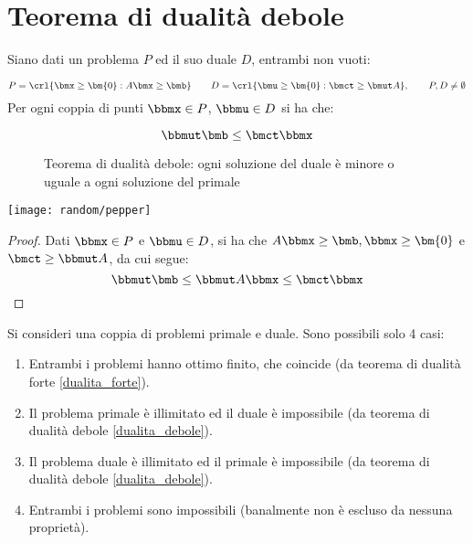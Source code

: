\documentclass[\main/main.tex]{subfiles}
\begin{document}
\section{Teorema di dualità debole}
\begin{minipage}{\textwidth}
  \begin{minipage}{.83\textwidth}
    \flushleft
    \begin{theorem}
      \label{dualita_debole}
      Siano dati un problema $P$ ed il suo duale $D$, entrambi non vuoti:

      \[
        P = \crl{\bmx \geq \bm{0}: A\bmx \geq \bmb} \qquad D = \crl{\bmu \geq \bm{0}: \bmct \geq \bmut A}, \qquad P, D \neq \emptyset
      \]
      Per ogni coppia di punti $\bbmx \in P$, $\bbmu \in D$ si ha che:

      \begin{figure}
        \[
          \bbmut \bmb \leq \bmct\bbmx
        \]
        \caption{Teorema di dualità debole: ogni soluzione del duale è minore o uguale a ogni soluzione del primale}
      \end{figure}
    \end{theorem}
  \end{minipage}\hfill
  \begin{minipage}{0.15\textwidth}\center
    \texttt{[image: random/pepper]}
  \end{minipage}
\end{minipage}



\begin{proof}
  Dati $\bbmx \in P$ e $\bbmu \in D$, si ha che $A\bbmx \geq \bmb, \bbmx \geq \bm{0}$ e $\bmct \geq \bbmut A$, da cui segue:
  \[
    \bbmut \bmb \leq \bbmut A \bbmx \leq \bmct \bbmx
  \]
\end{proof}

\begin{corollary}
  Si consideri una coppia di problemi primale e duale. Sono possibili solo 4 casi:
  \begin{enumerate}
    \item Entrambi i problemi hanno ottimo finito, che coincide (da teorema di dualità forte \ref{dualita_forte}).
    \item Il problema primale è illimitato ed il duale è impossibile (da teorema di dualità debole \ref{dualita_debole}).
    \item Il problema duale è illimitato ed il primale è impossibile (da teorema di dualità debole \ref{dualita_debole}).
    \item Entrambi i problemi sono impossibili (banalmente non è escluso da nessuna proprietà).
  \end{enumerate}
\end{corollary}
\end{document}
